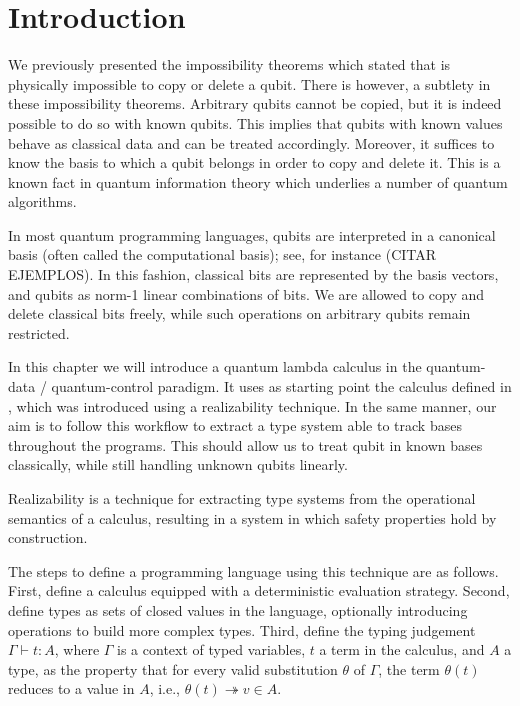 \section{Introduction}

We previously presented the impossibility theorems which stated that is physically impossible to copy or delete a qubit. There is however, a subtlety in these impossibility theorems. Arbitrary qubits cannot be copied, but it is indeed possible to do so with known qubits. This implies that qubits with known values
behave as classical data and can be treated accordingly. Moreover, it suffices to know the basis to which a qubit belongs in order to copy and delete it. This is a known fact in quantum information theory which underlies a number of quantum algorithms. 

In most quantum programming languages, qubits are interpreted in a canonical basis (often called the computational basis); see, for instance {(\color{red}CITAR EJEMPLOS)}. In this fashion, classical bits are represented by the basis vectors, and qubits as norm-1 linear combinations of bits. We are allowed to copy and delete classical bits freely, while such operations on arbitrary qubits remain restricted.

In this chapter we will introduce a quantum lambda calculus in the quantum-data / quantum-control paradigm. It uses as starting point the calculus defined in \cite{DiazcaroGuillermoMiquelValironLICS19}, which was introduced using a realizability technique. In the same manner, our aim is to follow this workflow to extract a type system able to track bases throughout the programs. This should allow us to treat qubit in known bases classically, while still handling unknown qubits linearly.


Realizability is a technique for extracting type systems from the operational semantics of a calculus, resulting in a system in which safety properties hold by construction.

The steps to define a programming language using this technique are as follows. First, define a calculus equipped with a deterministic evaluation strategy. Second, define types as sets of closed values in the language, optionally introducing operations to build more complex types. Third, define the typing judgement $\Gamma \vdash t : A$, where $\Gamma$ is a context of typed variables, $t$ a term in the calculus, and $A$ a type, as the property that for every valid substitution $\theta$ of $\Gamma$, the term $\theta(t)$ reduces to a value in $A$, i.e., $\theta(t) \twoheadrightarrow v \in A$.

